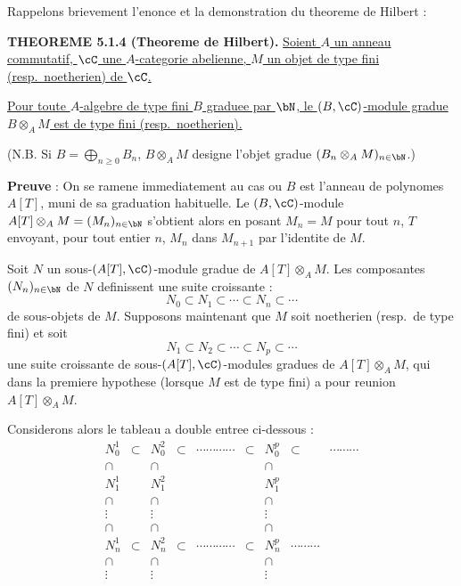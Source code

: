 Rappelons brievement l'enonce et la demonstration du theoreme de Hilbert :

\medskip
\noindent\textbf{THEOREME 5.1.4 (Theoreme de Hilbert).} \underline{Soient $A$ un anneau commutatif, $\cC$ une $A$-categorie abelienne, $M$ un objet de type fini (resp.\ noetherien) de $\cC$.}

\underline{Pour toute $A$-algebre de type fini $B$ graduee par $\bN$, le $(B,\cC)$-module gradue $B \otimes_A M$ est de type fini (resp.\ noetherien).}

(N.B. Si $B = \bigoplus_{n \geq 0} B_n$, $B \otimes_A M$ designe l'objet gradue $(B_n \otimes_A M)_{n \in \bN}$.)

\textbf{Preuve} : On se ramene immediatement au cas ou $B$ est l'anneau de polynomes $A[T]$, muni de sa graduation habituelle. Le $(B,\cC)$-module $A[T] \otimes_A M = (M_n)_{n \in \bN}$ s'obtient alors en posant $M_n = M$ pour tout $n$, $T$ envoyant, pour tout entier $n$, $M_n$ dans $M_{n+1}$ par l'identite de $M$.

Soit $N$ un sous-$(A[T],\cC)$-module gradue de $A[T] \otimes_A M$. Les composantes $(N_n)_{n \in \bN}$ de $N$ definissent une suite croissante :
\[
N_0 \subset N_1 \subset \cdots \subset N_n \subset \cdots
\]
de sous-objets de $M$. Supposons maintenant que $M$ soit noetherien (resp.\ de type fini) et soit
\[
N_1 \subset N_2 \subset \cdots \subset N_p \subset \cdots
\]
une suite croissante de sous-$(A[T],\cC)$-modules gradues de $A[T] \otimes_A M$, qui dans la premiere hypothese (lorsque $M$ est de type fini) a pour reunion $A[T] \otimes_A M$.

Considerons alors le tableau a double entree ci-dessous :
\[
\begin{array}{ccccccccc}
N_0^1 & \subset & N_0^2 & \subset & \cdots\cdots\cdots\cdots & \subset & N_0^p & \subset & \cdots\cdots\cdots \\[-2pt]
\cap & & \cap & & & & \cap \\[-2pt]
N_1^1 & & N_1^2 & & & & N_1^p \\[-2pt]
\cap & & \cap & & & & \cap \\[-2pt]
\vdots & & \vdots & & & & \vdots \\[-2pt]
\cap & & \cap & & & & \cap \\[-2pt]
N_n^1 & \subset & N_n^2 & \subset & \cdots\cdots\cdots\cdots & \subset & N_n^p & \cdots\cdots\cdots \\[-2pt]
\cap & & \cap & & & & \cap \\[-2pt]
\vdots & & \vdots & & & & \vdots
\end{array}
\]

